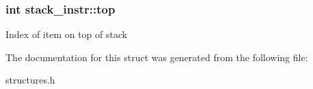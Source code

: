\subsubsection[{\texorpdfstring{top}{top}}]{\setlength{\rightskip}{0pt plus 5cm}int stack\+\_\+instr\+::top}\hypertarget{structstack__instr_a1b85b397a6e1175d2ec961ce410ac9fa}{}\label{structstack__instr_a1b85b397a6e1175d2ec961ce410ac9fa}
Index of item on top of stack 

The documentation for this struct was generated from the following file\+:\begin{DoxyCompactItemize}
\item 
structures.\+h\end{DoxyCompactItemize}
